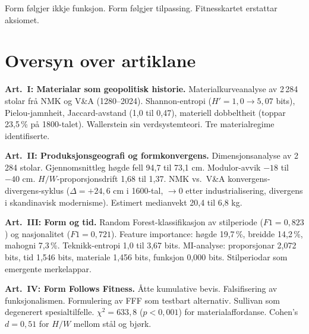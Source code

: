 \documentclass[12pt, a4paper]{article}
\begin{document}
Form følgjer ikkje funksjon. Form følgjer tilpassing. Fitnesskartet erstattar aksiomet.


\section*{Oversyn over artiklane}

\noindent\textbf{Art.~I: Materialar som geopolitisk historie.} Materialkurveanalyse av 2\,284 stolar frå NMK og V\&A (1280--2024). Shannon-entropi ($H' = 1{,}0 \rightarrow 5{,}07$ bits), Pielou-jamnheit, Jaccard-avstand (1,0 til 0,47), materiell dobbeltheit (toppar 23,5\,\% på 1800-talet). Wallerstein sin verdsystemteori. Tre materialregime identifiserte.

\medskip
\noindent\textbf{Art.~II: Produksjonsgeografi og formkonvergens.} Dimensjonsanalyse av 2\,284 stolar. Gjennomsnittleg høgde fell 94,7 til 73,1 cm. Modulor-avvik $-18$ til $-40$ cm. $H/W$-proporsjonsdrift 1,68 til 1,37. NMK vs.\ V\&A konvergens-divergens-syklus ($\Delta = +24{,}6$ cm i 1600-tal, $\rightarrow 0$ etter industrialisering, divergens i skandinavisk modernisme). Estimert medianvekt 20,4 til 6,8 kg.

\medskip
\noindent\textbf{Art.~III: Form og tid.} Random Forest-klassifikasjon av stilperiode ($F1 = 0{,}823$) og nasjonalitet ($F1 = 0{,}721$). Feature importance: høgde 19,7\,\%, breidde 14,2\,\%, mahogni 7,3\,\%. Teknikk-entropi 1,0 til 3,67 bits. MI-analyse: proporsjonar 2,072 bits, tid 1,546 bits, materiale 1,456 bits, funksjon 0,000 bits. Stilperiodar som emergente merkelappar.

\medskip
\noindent\textbf{Art.~IV: Form Follows Fitness.} Åtte kumulative bevis. Falsifisering av funksjonalismen. Formulering av FFF som testbart alternativ. Sullivan som degenerert spesialtilfelle. $\chi^2 = 633{,}8$ ($p < 0{,}001$) for materialaffordanse. Cohen's $d = 0{,}51$ for $H/W$ mellom stål og bjørk.




\end{document}
